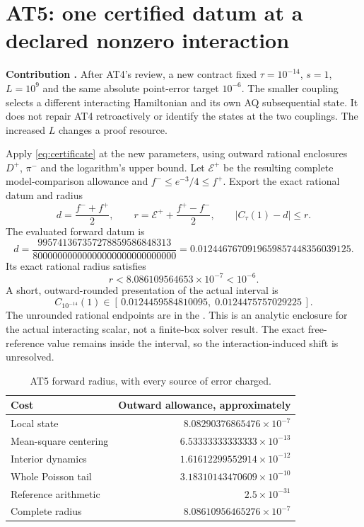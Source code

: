 \section{AT5: one certified datum at a declared nonzero interaction}
\label{sec:at5}

\textbf{Contribution .} After AT4's review, a new contract
fixed $\tau=10^{-14}$, $s=1$, $L=10^9$ and the same absolute point-error target
$10^{-6}$. The smaller coupling selects a different interacting Hamiltonian and
its own AQ subsequential state. It does not repair AT4 retroactively or identify
the states at the two couplings. The increased $L$ changes a proof resource.

Apply \eqref{eq:certificate} at the new parameters, using outward rational
enclosures $D^+$, $\pi^-$ and the logarithm's upper bound. Let $\mathcal E^+$ be
the resulting complete model-comparison allowance and
$f^-\le e^{-3}/4\le f^+$. Export the exact rational datum and radius
\begin{equation}
 d=\frac{f^-+f^+}{2},\qquad
 r=\mathcal E^++\frac{f^+-f^-}{2},\qquad
 |C_\tau(1)-d|\le r.
 \label{eq:export}
\end{equation}
The evaluated forward datum is
\begin{equation}
 d=\frac{995741367357278859586848313}
 {80000000000000000000000000000}
 =0.0124467670919659857448356039125.
 \label{eq:datum}
\end{equation}
Its exact rational radius satisfies
\begin{equation}
 r<8.086109564653\times10^{-7}<10^{-6}.
 \label{eq:node-radius}
\end{equation}
A short, outward-rounded presentation of the actual interval is
\begin{equation}
 C_{10^{-14}}(1)\in
 [\,0.0124459584810095,\;0.0124475757029225\,].
 \label{eq:node-interval}
\end{equation}
The unrounded rational endpoints are in the
.
This is an analytic enclosure for the actual interacting scalar, not a
finite-box solver result. The exact free-reference value remains inside the
interval, so the interaction-induced shift is unresolved.

\begin{table}[htbp]
\centering\small
\caption{AT5 forward radius, with every source of error charged.}
\label{tab:nodecost}
\begin{tabular}{lr}
\toprule
Cost & Outward allowance, approximately\\
\midrule
Local state & $8.08290376865476\times10^{-7}$\\
Mean-square centering & $6.53333333333333\times10^{-13}$\\
Interior dynamics & $1.61612299552914\times10^{-12}$\\
Whole Poisson tail & $3.18310143470609\times10^{-10}$\\
Reference arithmetic & $2.5\times10^{-31}$\\
\midrule
Complete radius & $8.08610956465276\times10^{-7}$\\
\bottomrule
\end{tabular}
\end{table}

